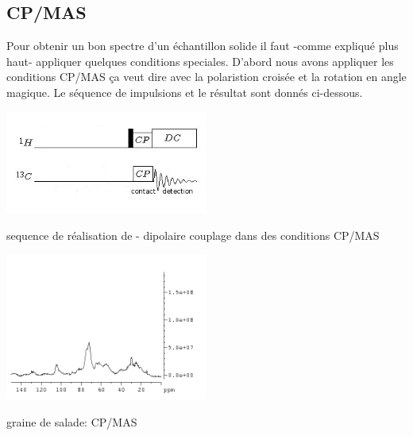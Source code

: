 \documentclass[a4paper,12pt]{scrartcl}
\begin{document}
  \subsection{CP/MAS}
Pour obtenir un bon spectre d'un échantillon solide il faut -comme expliqué plus haut- appliquer quelques conditions speciales. D'abord nous avons appliquer les conditions CP/MAS \c ca veut dire avec la polaristion croisée et la rotation en angle magique. Le séquence de impulsions et le résultat sont donnés ci-dessous.
 \begin{figurehere}
    \center
     \includegraphics[width=0.5\textwidth]{bilder/PDSD1.png}
     \caption{sequence de réalisation de  -  dipolaire couplage dans des conditions CP/MAS}
    \end{figurehere}
 \begin{figurehere}
    \center
    \includegraphics[width=0.5\textwidth]{bilder/graine_solide.png}
    \caption{graine de salade: CP/MAS}
   \end{figurehere}
\end{document}
